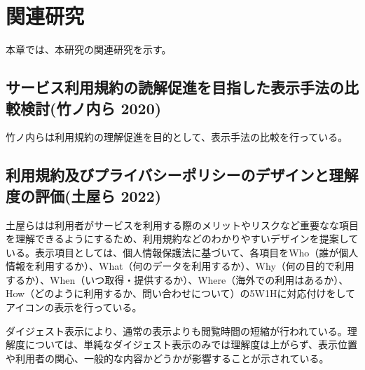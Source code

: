 \chapter{関連研究}
\label{related}

本章では、本研究の関連研究を示す。

\section{サービス利用規約の読解促進を目指した表示手法の比較検討(竹ノ内ら 2020)}
竹ノ内ら\cite{竹ノ内2020}は利用規約の理解促進を目的として、表示手法の比較を行っている。

\section{利用規約及びプライバシーポリシーのデザインと理解度の評価(土屋ら 2022)}
土屋らは\cite{土屋2022}は利用者がサービスを利用する際のメリットやリスクなど重要なな項目を理解できるようにするため、利用規約などのわかりやすいデザインを提案している。表示項目としては、個人情報保護法に基づいて、各項目をWho（誰が個人情報を利用するか）、What（何のデータを利用するか）、Why（何の目的で利用するか）、When（いつ取得・提供するか）、Where（海外での利用はあるか）、How（どのように利用するか、問い合わせについて）の5W1Hに対応付けをしてアイコンの表示を行っている。

ダイジェスト表示により、通常の表示よりも閲覧時間の短縮が行われている。理解度については、単純なダイジェスト表示のみでは理解度は上がらず、表示位置や利用者の関心、一般的な内容かどうかが影響することが示されている。